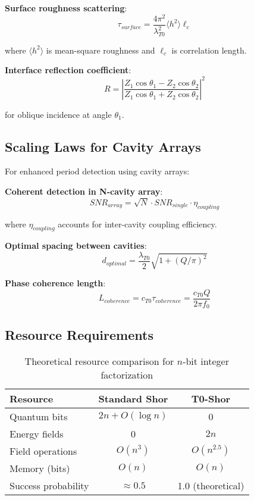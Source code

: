 \documentclass[12pt,a4paper]{article}
\begin{document}
	\textbf{Surface roughness scattering}:
	\begin{equation}
		\tau_{surface} = \frac{4\pi^2}{\lambda_{T0}^2} \langle h^2 \rangle \ell_c
	\end{equation}
	
	where $\langle h^2 \rangle$ is mean-square roughness and $\ell_c$ is correlation length.
	
	\textbf{Interface reflection coefficient}:
	\begin{equation}
		R = \left|\frac{Z_1 \cos\theta_1 - Z_2 \cos\theta_2}{Z_1 \cos\theta_1 + Z_2 \cos\theta_2}\right|^2
	\end{equation}
	
	for oblique incidence at angle $\theta_1$.
	
	\subsection{Scaling Laws for Cavity Arrays}
	
	For enhanced period detection using cavity arrays:
	
	\textbf{Coherent detection in N-cavity array}:
	\begin{equation}
		SNR_{array} = \sqrt{N} \cdot SNR_{single} \cdot \eta_{coupling}
	\end{equation}
	
	where $\eta_{coupling}$ accounts for inter-cavity coupling efficiency.
	
	\textbf{Optimal spacing between cavities}:
	\begin{equation}
		d_{optimal} = \frac{\lambda_{T0}}{2} \sqrt{1 + (Q/\pi)^2}
	\end{equation}
	
	\textbf{Phase coherence length}:
	\begin{equation}
		L_{coherence} = c_{T0} \tau_{coherence} = \frac{c_{T0} Q}{2\pi f_0}
	\end{equation}
	
	\subsection{Resource Requirements}
	
	\begin{table}[htbp]
		\centering
		\begin{tabular}{lcc}
			\toprule
			\textbf{Resource} & \textbf{Standard Shor} & \textbf{T0-Shor} \\
			\midrule
			Quantum bits & $2n + O(\log n)$ & 0 \\
			Energy fields & 0 & $2n$ \\
			Field operations & $O(n^3)$ & $O(n^{2.5})$ \\
			Memory (bits) & $O(n)$ & $O(n)$ \\
			Success probability & $\approx 0.5$ & 1.0 (theoretical) \\
			\bottomrule
		\end{tabular}
		\caption{Theoretical resource comparison for $n$-bit integer factorization}
		\label{tab:complexity}
	\end{table}
	
\end{document}

